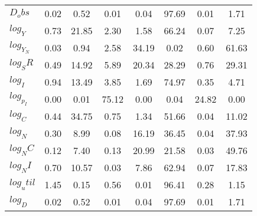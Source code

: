 \begin{center}
\begin{longtable}{lccccccc}
$D_obs     $	 & 	        0.02	 & 	        0.52	 & 	        0.01	 & 	        0.04	 & 	       97.69	 & 	        0.01	 & 	        1.71 \\ 
$log_Y     $	 & 	        0.73	 & 	       21.85	 & 	        2.30	 & 	        1.58	 & 	       66.24	 & 	        0.07	 & 	        7.25 \\ 
$log_Y_N   $	 & 	        0.03	 & 	        0.94	 & 	        2.58	 & 	       34.19	 & 	        0.02	 & 	        0.60	 & 	       61.63 \\ 
$log_SR    $	 & 	        0.49	 & 	       14.92	 & 	        5.89	 & 	       20.34	 & 	       28.29	 & 	        0.76	 & 	       29.31 \\ 
$log_I     $	 & 	        0.94	 & 	       13.49	 & 	        3.85	 & 	        1.69	 & 	       74.97	 & 	        0.35	 & 	        4.71 \\ 
$log_p_I   $	 & 	        0.00	 & 	        0.01	 & 	       75.12	 & 	        0.00	 & 	        0.04	 & 	       24.82	 & 	        0.00 \\ 
$log_C     $	 & 	        0.44	 & 	       34.75	 & 	        0.75	 & 	        1.34	 & 	       51.66	 & 	        0.04	 & 	       11.02 \\ 
$log_N     $	 & 	        0.30	 & 	        8.99	 & 	        0.08	 & 	       16.19	 & 	       36.45	 & 	        0.04	 & 	       37.93 \\ 
$log_NC    $	 & 	        0.12	 & 	        7.40	 & 	        0.13	 & 	       20.99	 & 	       21.58	 & 	        0.03	 & 	       49.76 \\ 
$log_NI    $	 & 	        0.70	 & 	       10.57	 & 	        0.03	 & 	        7.86	 & 	       62.94	 & 	        0.07	 & 	       17.83 \\ 
$log_util  $	 & 	        1.45	 & 	        0.15	 & 	        0.56	 & 	        0.01	 & 	       96.41	 & 	        0.28	 & 	        1.15 \\ 
$log_D     $	 & 	        0.02	 & 	        0.52	 & 	        0.01	 & 	        0.04	 & 	       97.69	 & 	        0.01	 & 	        1.71 \\ 
\end{longtable}
 \end{center}
